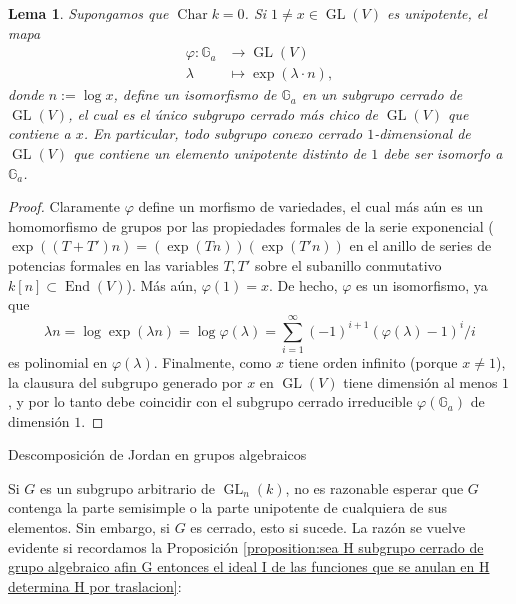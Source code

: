 \documentclass[spanish,12pt]{amsart}
\makeatletter
\renewcommand\subsection{\@startsection{subsection}{2}%
  \z@{.5\linespacing\@plus.7\linespacing}{-.5em}%
  {\normalfont\sffamily}}
\newtheorem{lemma}[theorem]{Lema}
\theoremstyle{definition}
\theoremstyle{remark}
\numberwithin{equation}{section}
\newcommand{\Char}[1]{\operatorname{Char} #1}
\makeatother
\begin{document}
\begin{lemma}
Supongamos que $\Char k = 0$. Si $1 \neq x \in \operatorname{GL} (V)$ es unipotente, el mapa
\begin{align*}
\varphi : \mathbb{G}_a &\longrightarrow \operatorname{GL} (V) \\
\lambda &\longmapsto \exp (\lambda \cdot n),
\end{align*}
donde $n := \log x$, define un isomorfismo de $ \mathbb{G}_a$ en un subgrupo cerrado de $\operatorname{GL} (V)$, el cual es el único subgrupo cerrado más chico de $\operatorname{GL}(V)$ que contiene a $x$. En particular, todo subgrupo conexo cerrado $1$-dimensional de $\operatorname{GL} (V)$ que contiene un elemento unipotente distinto de $1$ debe ser isomorfo a $\mathbb{G}_a$.
\end{lemma}
\begin{proof}
Claramente $\varphi$ define un morfismo de variedades, el cual más aún es un homomorfismo de grupos por las propiedades formales de la serie exponencial ($\exp ((T+T')n) = (\exp (T n)) (\exp (T' n))$ en el anillo de series de potencias formales en las variables $T,T'$ sobre el subanillo conmutativo $k[n] \subset \operatorname{End} (V)$). Más aún, $\varphi (1) = x$. De hecho, $\varphi$ es un isomorfismo, ya que
\[
    \lambda n = \log \exp (\lambda n) = \log \varphi (\lambda) = \sum_{i = 1}^\infty (-1)^{i+1} (\varphi (\lambda)- 1)^i / i
\]
es polinomial en $\varphi (\lambda)$. Finalmente, como $x$ tiene orden infinito (porque $x \neq 1$), la clausura del subgrupo generado por $x$ en $\operatorname{GL} (V)$ tiene dimensión al menos $1$, y por lo tanto debe coincidir con el subgrupo cerrado irreducible $\varphi (\mathbb{G}_a)$ de dimensión $1$.
\end{proof}



\subsection{Descomposición de Jordan en grupos algebraicos}

Si $G$ es un subgrupo arbitrario de $\operatorname{GL}_n (k)$, no es razonable esperar que $G$ contenga la parte semisimple o la parte unipotente de cualquiera de sus elementos. Sin embargo, si $G$ es cerrado, esto si sucede. La razón se vuelve evidente si recordamos la Proposición \ref{proposition:sea H subgrupo cerrado de grupo algebraico afin G entonces el ideal I de las funciones que se anulan en H determina H por traslacion}:
\end{document}
